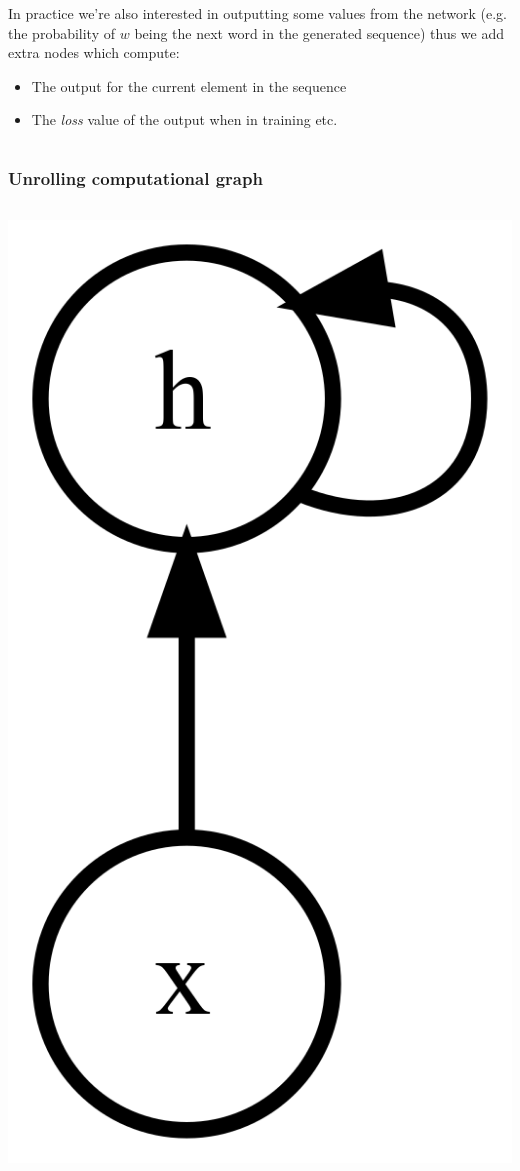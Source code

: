 \documentclass{beamer}
\begin{document}
\begin{frame}
\begin{columns}
\begin{column}{0.7\textwidth}
      In practice we're also interested in outputting some values from the network (e.g. the probability of \(w\) being the next word in the generated sequence) thus we add extra nodes which compute:
      \begin{itemize}
        \item The output for the current element in the sequence
        \item The \textit{loss} value of the output when in training etc.
      \end{itemize}
    \end{column}
  \end{columns}
\end{frame}
\begin{frame}
  \frametitle{Unrolling computational graph}
  \begin{columns}
    \begin{column}{0.3\textwidth}
      \begin{center}
        \includegraphics[height=0.6\textheight]{../img/rnn-comp-graph.png}

\end{center}
\end{column}
\end{columns}
\end{frame}
\end{document}
